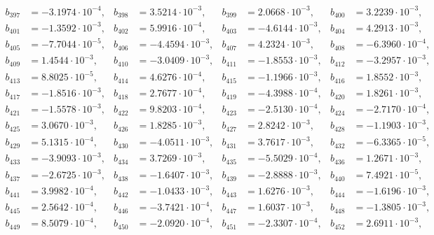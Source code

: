 \begin{align*}
b_{ 397 } &= -3.1974 \cdot 10^{ -4 }, & b_{ 398 } &= 3.5214 \cdot 10^{ -3 }, & b_{ 399 } &= 2.0668 \cdot 10^{ -3 }, & b_{ 400 } &= 3.2239 \cdot 10^{ -3 },\\ 
b_{ 401 } &= -1.3592 \cdot 10^{ -3 }, & b_{ 402 } &= 5.9916 \cdot 10^{ -4 }, & b_{ 403 } &= -4.6144 \cdot 10^{ -3 }, & b_{ 404 } &= 4.2913 \cdot 10^{ -3 },\\ 
b_{ 405 } &= -7.7044 \cdot 10^{ -5 }, & b_{ 406 } &= -4.4594 \cdot 10^{ -3 }, & b_{ 407 } &= 4.2324 \cdot 10^{ -3 }, & b_{ 408 } &= -6.3960 \cdot 10^{ -4 },\\ 
b_{ 409 } &= 1.4544 \cdot 10^{ -3 }, & b_{ 410 } &= -3.0409 \cdot 10^{ -3 }, & b_{ 411 } &= -1.8553 \cdot 10^{ -3 }, & b_{ 412 } &= -3.2957 \cdot 10^{ -3 },\\ 
b_{ 413 } &= 8.8025 \cdot 10^{ -5 }, & b_{ 414 } &= 4.6276 \cdot 10^{ -4 }, & b_{ 415 } &= -1.1966 \cdot 10^{ -3 }, & b_{ 416 } &= 1.8552 \cdot 10^{ -3 },\\ 
b_{ 417 } &= -1.8516 \cdot 10^{ -3 }, & b_{ 418 } &= 2.7677 \cdot 10^{ -4 }, & b_{ 419 } &= -4.3988 \cdot 10^{ -4 }, & b_{ 420 } &= 1.8261 \cdot 10^{ -3 },\\ 
b_{ 421 } &= -1.5578 \cdot 10^{ -3 }, & b_{ 422 } &= 9.8203 \cdot 10^{ -4 }, & b_{ 423 } &= -2.5130 \cdot 10^{ -4 }, & b_{ 424 } &= -2.7170 \cdot 10^{ -4 },\\ 
b_{ 425 } &= 3.0670 \cdot 10^{ -3 }, & b_{ 426 } &= 1.8285 \cdot 10^{ -3 }, & b_{ 427 } &= 2.8242 \cdot 10^{ -3 }, & b_{ 428 } &= -1.1903 \cdot 10^{ -3 },\\ 
b_{ 429 } &= 5.1315 \cdot 10^{ -4 }, & b_{ 430 } &= -4.0511 \cdot 10^{ -3 }, & b_{ 431 } &= 3.7617 \cdot 10^{ -3 }, & b_{ 432 } &= -6.3365 \cdot 10^{ -5 },\\ 
b_{ 433 } &= -3.9093 \cdot 10^{ -3 }, & b_{ 434 } &= 3.7269 \cdot 10^{ -3 }, & b_{ 435 } &= -5.5029 \cdot 10^{ -4 }, & b_{ 436 } &= 1.2671 \cdot 10^{ -3 },\\ 
b_{ 437 } &= -2.6725 \cdot 10^{ -3 }, & b_{ 438 } &= -1.6407 \cdot 10^{ -3 }, & b_{ 439 } &= -2.8888 \cdot 10^{ -3 }, & b_{ 440 } &= 7.4921 \cdot 10^{ -5 },\\ 
b_{ 441 } &= 3.9982 \cdot 10^{ -4 }, & b_{ 442 } &= -1.0433 \cdot 10^{ -3 }, & b_{ 443 } &= 1.6276 \cdot 10^{ -3 }, & b_{ 444 } &= -1.6196 \cdot 10^{ -3 },\\ 
b_{ 445 } &= 2.5642 \cdot 10^{ -4 }, & b_{ 446 } &= -3.7421 \cdot 10^{ -4 }, & b_{ 447 } &= 1.6037 \cdot 10^{ -3 }, & b_{ 448 } &= -1.3805 \cdot 10^{ -3 },\\ 
b_{ 449 } &= 8.5079 \cdot 10^{ -4 }, & b_{ 450 } &= -2.0920 \cdot 10^{ -4 }, & b_{ 451 } &= -2.3307 \cdot 10^{ -4 }, & b_{ 452 } &= 2.6911 \cdot 10^{ -3 },\\ 

\end{align*}
